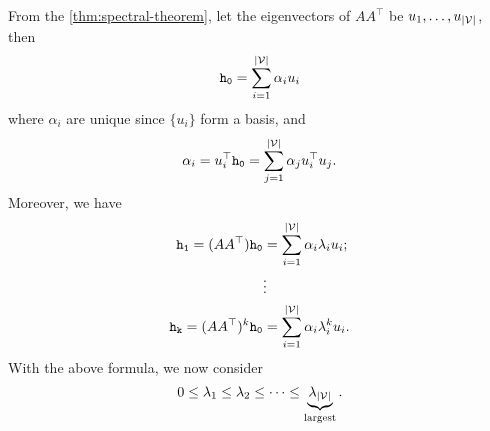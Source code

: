 From the \autoref{thm:spectral-theorem}, let the eigenvectors of \(A A^{\top} \) be \(u_1, \ldots , u_{\left\vert \mathcal{\MakeUppercase{v}} \right\vert } \), then
\[
	\mathtt{h_0} = \sum\limits_{i=1}^{\left\vert \mathcal{\MakeUppercase{v}} \right\vert } \alpha_i u_{i}
\]
where \(\alpha_{i}\) are unique since \(\{u_{i}\} \) form a basis, and
\[
	\alpha_{i} = u_{i}^{\top}\mathtt{h_0} = \sum\limits_{j=1}^{\left\vert \mathcal{\MakeUppercase{v}} \right\vert } \alpha_{j}u_{i}^{\top}u_{j}.
\]
Moreover, we have
\[
	\begin{split}
		\mathtt{h_1} = (A A^{\top})\mathtt{h_0} &= \sum\limits_{i=1}^{\left\vert \mathcal{\MakeUppercase{v}} \right\vert } \alpha_{i} \lambda_{i}u_{i};\\
		&\vdots\\
		\mathtt{h_k} = (A A^{\top})^k\mathtt{h_0} &= \sum\limits_{i=1}^{\left\vert \mathcal{\MakeUppercase{v}} \right\vert } \alpha_{i} \lambda_{i}^k u_{i}.\\
	\end{split}
\]
With the above formula, we now consider
\[
	0 \leq \lambda_1 \leq \lambda_2 \leq \cdots \leq \underbrace{\lambda_{\left\vert \mathcal{\MakeUppercase{v}} \right\vert}}_{\text{largest}}.
\]

